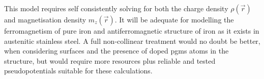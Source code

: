 This model requires self consistently solving for both the charge density $\rho(\vec{r})$ and magnetisation density $m_{z}(\vec{r})$.  It will be adequate for modelling the ferromagnetism of pure iron and antiferromagnetic structure of iron as it exists in austenitic stainless steel.  A full non-collinear treatment would no doubt be better, when considering surfaces and the presence of doped \acrshort{pgm}s atoms in the structure, but would require more resources plus reliable and tested pseudopotentials suitable for these calculations.




